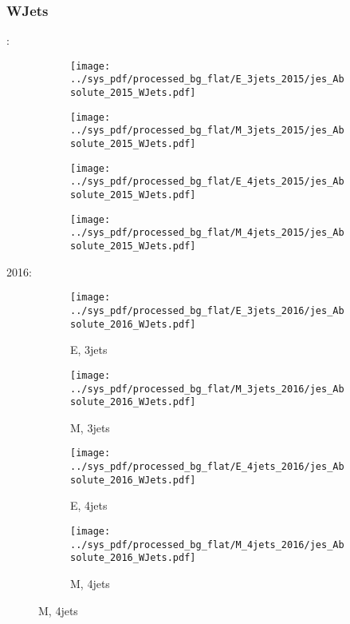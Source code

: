 \documentclass{beamer}
\begin{document}
\begin{frame}
\frametitle{WJets}
\fontsize{5}{1}:
\begin{figure}
\centering
\begin{subfigure}[b]{0.24\textwidth}
\texttt{[image: ../sys\_pdf/processed\_bg\_flat/E\_3jets\_2015/jes\_Absolute\_2015\_WJets.pdf]}
\end{subfigure}
\begin{subfigure}[b]{0.24\textwidth}
\texttt{[image: ../sys\_pdf/processed\_bg\_flat/M\_3jets\_2015/jes\_Absolute\_2015\_WJets.pdf]}
\end{subfigure}
\begin{subfigure}[b]{0.24\textwidth}
\texttt{[image: ../sys\_pdf/processed\_bg\_flat/E\_4jets\_2015/jes\_Absolute\_2015\_WJets.pdf]}
\end{subfigure}
\begin{subfigure}[b]{0.24\textwidth}
\texttt{[image: ../sys\_pdf/processed\_bg\_flat/M\_4jets\_2015/jes\_Absolute\_2015\_WJets.pdf]}
\end{subfigure}
\end{figure}
2016:
\begin{figure}
\centering
\begin{subfigure}[b]{0.24\textwidth}
\texttt{[image: ../sys\_pdf/processed\_bg\_flat/E\_3jets\_2016/jes\_Absolute\_2016\_WJets.pdf]}
\captionsetup{font=tiny}
\caption{E, 3jets}
\end{subfigure}
\begin{subfigure}[b]{0.24\textwidth}
\texttt{[image: ../sys\_pdf/processed\_bg\_flat/M\_3jets\_2016/jes\_Absolute\_2016\_WJets.pdf]}
\captionsetup{font=tiny}
\caption{M, 3jets}
\end{subfigure}
\begin{subfigure}[b]{0.24\textwidth}
\texttt{[image: ../sys\_pdf/processed\_bg\_flat/E\_4jets\_2016/jes\_Absolute\_2016\_WJets.pdf]}
\captionsetup{font=tiny}
\caption{E, 4jets}
\end{subfigure}
\begin{subfigure}[b]{0.24\textwidth}
\texttt{[image: ../sys\_pdf/processed\_bg\_flat/M\_4jets\_2016/jes\_Absolute\_2016\_WJets.pdf]}
\captionsetup{font=tiny}
\caption{M, 4jets}
\end{subfigure}
\end{figure}
\end{frame}
\end{document}
